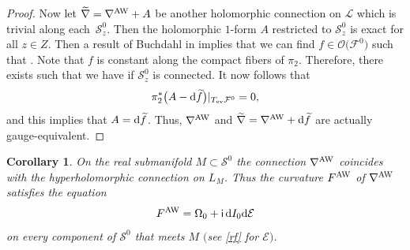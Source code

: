 \documentclass[pdftex]{sigma}
\numberwithin{equation}{section}
\newtheorem{Corollary}[Theorem]{Corollary}
\theoremstyle{definition}
\renewcommand{\i}{\mathsf{i}}
\begin{document}
\begin{proof}
Now let $\widetilde\nabla = \nabla^{\rm AW} +A$ be another holomorphic connection on $\mathcal{L}$
which is trivial along each~$\mathcal S_z^0$. Then the holomorphic $1$-form $A$ restricted to
$\mathcal{S}_z^0$ is exact for all $z \in Z$. Then a result of Buchdahl in \cite{Buchdahl} implies that
we can find $f \in \mathcal O\bigl(\mathcal F^0\bigr)$ such that . Note that $f$ is constant along the compact fibers
of $\pi_2$. Therefore, there exists  such that we have
if $\mathcal S_z^0$ is connected. It now follows that
\[
\pi_2^*\bigl(A-{\rm d}\widetilde f\bigr)|_{T_{\operatorname{ev}}\mathcal F^0} = 0,
\]
and this implies that $A = {\rm d}\widetilde{f}$. Thus, $\nabla^{\rm AW}$ and $\widetilde\nabla =
\nabla^{\rm AW} +{\rm d}\widetilde{f}$ are actually gauge-equivalent.
\end{proof}

\begin{Corollary}
On the real submanifold $M \subset \mathcal S^0$ the connection $\nabla^{\rm AW}$
coincides with the hyperholomorphic connection on $L_M$.
Thus the curvature $F^{\rm AW}$ of $\nabla^{\rm AW}$ satisfies the equation
\[
F^{\rm AW} = \Omega_0 + \i\, {\rm d}I_0{\rm d}\mathcal E
\]
on every component of $\mathcal S^0$ that meets $M$ $($see \eqref{rf} for $\mathcal E)$.
\end{Corollary}
\end{document}
